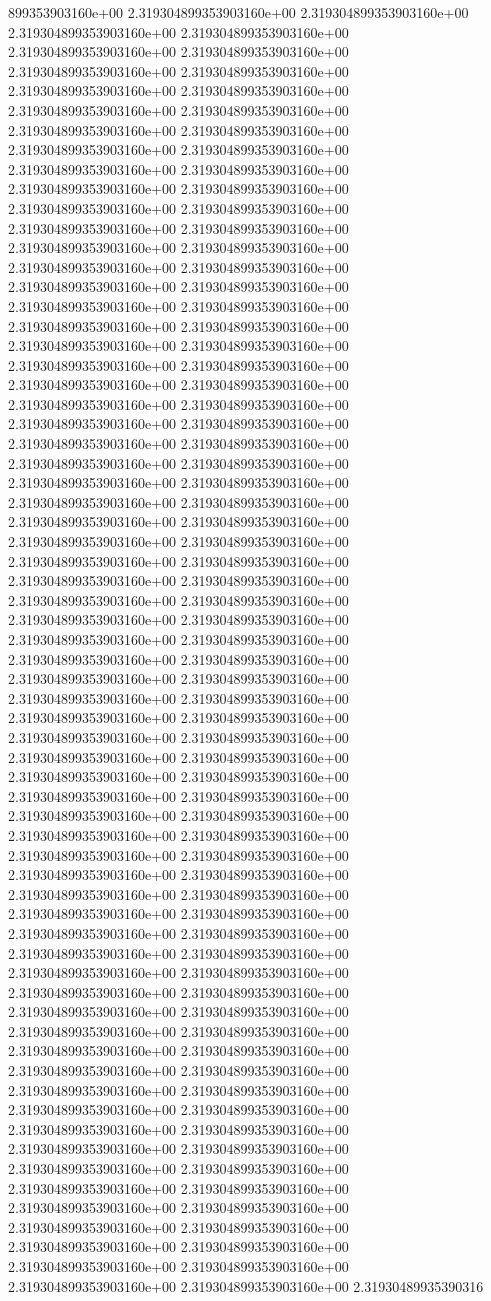 899353903160e+00	2.319304899353903160e+00	2.319304899353903160e+00	2.319304899353903160e+00	2.319304899353903160e+00	2.319304899353903160e+00	2.319304899353903160e+00	2.319304899353903160e+00	2.319304899353903160e+00	2.319304899353903160e+00	2.319304899353903160e+00	2.319304899353903160e+00	2.319304899353903160e+00	2.319304899353903160e+00	2.319304899353903160e+00	2.319304899353903160e+00	2.319304899353903160e+00	2.319304899353903160e+00	2.319304899353903160e+00	2.319304899353903160e+00	2.319304899353903160e+00	2.319304899353903160e+00	2.319304899353903160e+00	2.319304899353903160e+00	2.319304899353903160e+00	2.319304899353903160e+00	2.319304899353903160e+00	2.319304899353903160e+00	2.319304899353903160e+00	2.319304899353903160e+00	2.319304899353903160e+00	2.319304899353903160e+00	2.319304899353903160e+00	2.319304899353903160e+00	2.319304899353903160e+00	2.319304899353903160e+00	2.319304899353903160e+00	2.319304899353903160e+00	2.319304899353903160e+00	2.319304899353903160e+00	2.319304899353903160e+00	2.319304899353903160e+00	2.319304899353903160e+00	2.319304899353903160e+00	2.319304899353903160e+00	2.319304899353903160e+00	2.319304899353903160e+00	2.319304899353903160e+00	2.319304899353903160e+00	2.319304899353903160e+00	2.319304899353903160e+00	2.319304899353903160e+00	2.319304899353903160e+00	2.319304899353903160e+00	2.319304899353903160e+00	2.319304899353903160e+00	2.319304899353903160e+00	2.319304899353903160e+00	2.319304899353903160e+00	2.319304899353903160e+00	2.319304899353903160e+00	2.319304899353903160e+00	2.319304899353903160e+00	2.319304899353903160e+00	2.319304899353903160e+00	2.319304899353903160e+00	2.319304899353903160e+00	2.319304899353903160e+00	2.319304899353903160e+00	2.319304899353903160e+00	2.319304899353903160e+00	2.319304899353903160e+00	2.319304899353903160e+00	2.319304899353903160e+00	2.319304899353903160e+00	2.319304899353903160e+00	2.319304899353903160e+00	2.319304899353903160e+00	2.319304899353903160e+00	2.319304899353903160e+00	2.319304899353903160e+00	2.319304899353903160e+00	2.319304899353903160e+00	2.319304899353903160e+00	2.319304899353903160e+00	2.319304899353903160e+00	2.319304899353903160e+00	2.319304899353903160e+00	2.319304899353903160e+00	2.319304899353903160e+00	2.319304899353903160e+00	2.319304899353903160e+00	2.319304899353903160e+00	2.319304899353903160e+00	2.319304899353903160e+00	2.319304899353903160e+00	2.319304899353903160e+00	2.319304899353903160e+00	2.319304899353903160e+00	2.319304899353903160e+00	2.319304899353903160e+00	2.319304899353903160e+00	2.319304899353903160e+00	2.319304899353903160e+00	2.319304899353903160e+00	2.319304899353903160e+00	2.319304899353903160e+00	2.319304899353903160e+00	2.319304899353903160e+00	2.319304899353903160e+00	2.319304899353903160e+00	2.319304899353903160e+00	2.319304899353903160e+00	2.319304899353903160e+00	2.319304899353903160e+00	2.319304899353903160e+00	2.319304899353903160e+00	2.319304899353903160e+00	2.319304899353903160e+00	2.319304899353903160e+00	2.319304899353903160e+00	2.319304899353903160e+00	2.319304899353903160e+00	2.319304899353903160e+00	2.319304899353903160e+00	2.319304899353903160e+00	2.319304899353903160e+00	2.319304899353903160e+00	2.319304899353903160e+00	2.319304899353903160e+00	2.319304899353903160e+00	2.319304899353903160e+00	2.319304899353903160e+00	2.31930489935390316